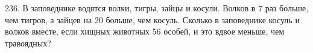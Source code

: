 236. В заповеднике водятся волки, тигры, зайцы и косули. Волков в 7 раз больше, чем тигров, а зайцев на 20 больше, чем косуль. Сколько в заповеднике косуль и волков вместе, если хищных животных 56 особей, и это вдвое меньше, чем травоядных?\\
